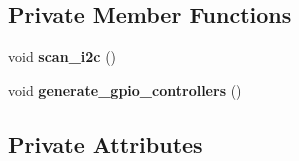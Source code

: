 \subsection*{Private Member Functions}
\begin{DoxyCompactItemize}
\item 
\mbox{\label{class_h_a_l_1_1_init_a8f2660725d95bada22b2663ccde4fcea}} 
void {\bfseries scan\+\_\+i2c} ()
\item 
\mbox{\label{class_h_a_l_1_1_init_a6489c15980390bc2862b3ddd9bd167ca}} 
void {\bfseries generate\+\_\+gpio\+\_\+controllers} ()
\end{DoxyCompactItemize}
\subsection*{Private Attributes}
